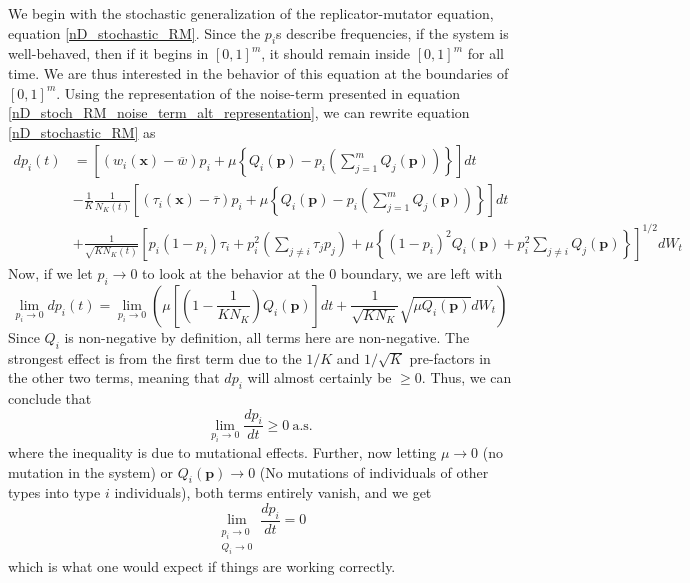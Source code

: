 We begin with the stochastic generalization of the replicator-mutator equation, equation \eqref{nD_stochastic_RM}. Since the $p_i$s describe frequencies, if the system is well-behaved, then if it begins in $[0,1]^{m}$, it should remain inside $[0,1]^{m}$ for all time. We are thus interested in the behavior of this equation at the boundaries of $[0,1]^{m}$. Using the representation of the noise-term presented in equation \eqref{nD_stoch_RM_noise_term_alt_representation}, we can rewrite equation \eqref{nD_stochastic_RM} as
\begin{equation}
	\label{App_well_behavedness_stoch_RM}
	\begin{aligned}
		dp_i(t) &= \left[(w_i(\mathbf{x}) - \overline{w})p_i + \mu\left\{Q_i(\mathbf{p}) - p_i\left(\sum\limits_{j=1}^{m}Q_j(\mathbf{p})\right)\right\}\right]dt\\[15pt]
		&- \frac{1}{K}\frac{1}{N_{K}(t)}\left[(\tau_i(\mathbf{x}) - \overline{\tau})p_i + \mu\left\{Q_i(\mathbf{p}) - p_i\left(\sum\limits_{j=1}^{m}Q_j(\mathbf{p})\right)\right\}\right]dt\\[15pt]
		&+ \frac{1}{\sqrt{KN_{K}(t)}}\left[p_i(1-p_i)\tau_i + p_i^2\left(\sum\limits_{j\neq i}\tau_j p_j\right) + \mu\left\{(1-p_i)^2Q_i(\mathbf{p}) + p_i^2 \sum\limits_{j\neq i}Q_j(\mathbf{p})\right\}\right]^{1/2}dW_t
	\end{aligned}
\end{equation}
Now, if we let $p_i \to 0$ to look at the behavior at the $0$ boundary, we are left with
\begin{equation*}
	\lim\limits_{p_i \to 0} dp_i(t) = \lim\limits_{p_i \to 0}\left( \mu\left[\left(1-\frac{1}{KN_K}\right)Q_i(\mathbf{p})\right]dt+ \frac{1}{\sqrt{KN_{K}}}\sqrt{\mu Q_i(\mathbf{p})}dW_t\right)
\end{equation*}
Since $Q_i$ is non-negative by definition, all terms here are non-negative. The strongest effect is from the first term due to the $1/K$ and $1/\sqrt{K}$ pre-factors in the other two terms, meaning that $dp_i$ will almost certainly be $\geq 0$. Thus, we can conclude that
\begin{equation*}
	\lim\limits_{p_i \to 0} \frac{dp_i}{dt} \geq 0 \ \textrm{a.s.}
\end{equation*}
where the inequality is due to mutational effects. Further, now letting $\mu \to 0$ (no mutation in the system) or $Q_i(\mathbf{p}) \to 0$ (No mutations of individuals of other types into type $i$ individuals), both terms entirely vanish, and we get
\begin{equation*}
	\lim_{\substack{p_i \to 0 \\ Q_i \to 0}} \frac{dp_i}{dt} = 0
\end{equation*}
which is what one would expect if things are working correctly.

